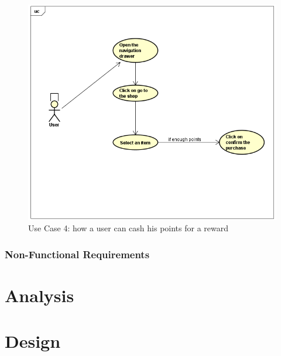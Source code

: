 \documentclass[paper=a4, fontsize=12pt,DIV=14]{scrartcl}    %
\begin{document}
		                \begin{figure}[!htbp]
		                    \center
		                    \includegraphics[scale=0.75]{img/shop.png}
		                    \caption{Use Case 4: how a user can cash his points for a reward}
		                \end{figure}

		                \paragraph{}


        		\subsubsection{Non-Functional Requirements}


    \newpage
        \section{Analysis}


    \newpage
        \section{Design}
\end{document}
